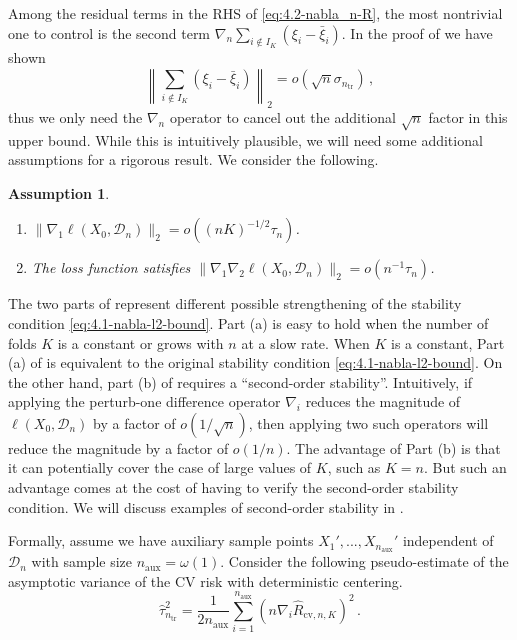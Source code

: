 \documentclass[11pt]{article}
\theoremstyle{plain}
\newtheorem{assumption}[theorem]{Assumption}
\newcommand{\cv}{{\mathrm{cv}}}
\newcommand{\aux}{{\mathrm{aux}}}
\newcommand{\tr}{{\mathrm{tr}}}
\newcommand{\D}{{\mathcal{D}}}
\begin{document}
Among the residual terms in the RHS of \eqref{eq:4.2-nabla_n-R}, the most nontrivial one to control is the second term
$\nabla_n\sum_{i\notin I_K}(\xi_i-\bar\xi_i)$.  In the proof of  we have shown 
$$\left\|\sum_{i\notin I_K}(\xi_i-\bar\xi_i)\right\|_2=o(\sqrt{n}\sigma_{n_\tr})\,,$$
thus we only need the $\nabla_n$ operator to cancel out the additional $\sqrt{n}$ factor in this upper bound. While this is intuitively plausible, we will need some additional assumptions for a rigorous result.  We consider the following.
\begin{assumption}
    \label{asm:4.2-second-order-stab}
    \begin{enumerate}
        \item [(a)]  $\|\nabla_1\ell(X_0,\D_n)\|_2=o((n K)^{-1/2}\tau_n)$.
        \item [(b)]  The loss function satisfies $\|\nabla_1\nabla_2\ell(X_0,\D_n)\|_2=o(n^{-1}\tau_n)$.
    \end{enumerate}
\end{assumption}
The two parts of  represent different possible strengthening of the stability condition \eqref{eq:4.1-nabla-l2-bound}.  Part (a) is easy to hold when the number of folds $K$ is a constant or grows with $n$ at a slow rate.  When $K$ is a constant, Part (a) of  is equivalent to the original stability condition \eqref{eq:4.1-nabla-l2-bound}.  On the other hand, part (b) of  requires a ``second-order stability''.  Intuitively, if applying the perturb-one difference operator $\nabla_i$ reduces the magnitude of $\ell(X_0,\D_n)$ by a factor of $o(1/\sqrt{n})$, then applying two such operators will reduce the magnitude by a factor of $o(1/n)$.  The advantage of Part (b) is that it can potentially cover the case of large values of $K$, such as $K=n$.  But such an advantage comes at the cost of having to verify the second-order stability condition.  We will discuss examples of second-order stability in .

Formally, assume we have auxiliary sample points $X_1',...,X_{n_\aux}'$ independent of $\D_n$ with sample size $n_\aux=\omega(1)$.  Consider the following pseudo-estimate of the asymptotic variance of the CV risk with deterministic centering.
\begin{equation}\label{eq:4.2-var-est-determ}
    \hat \tau_{n_\tr}^2 = \frac{1}{2n_\aux}\sum_{i=1}^{n_\aux} (n\nabla_i \hat R_{\cv,n,K})^2\,.
\end{equation}
\end{document}
